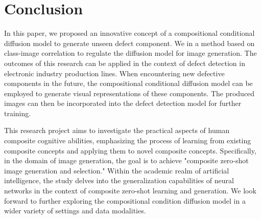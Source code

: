 \chapter{Conclusion}
In this paper, we proposed an innovative concept of a compositional conditional diffusion model to generate unseen defect component. We in a method based on class-image correlation to regulate the diffusion model for image generation. The outcomes of this research can be applied in the context of defect detection in electronic industry production lines. When encountering new defective components in the future, the compositional conditional diffusion model can be employed to generate visual representations of these components. The produced images can then be incorporated into the defect detection model for further training.

This research project aims to investigate the practical aspects of human composite cognitive abilities, emphasizing the process of learning from existing composite concepts and applying them to novel composite concepts. Specifically, in the domain of image generation, the goal is to achieve "composite zero-shot image generation and selection." Within the academic realm of artificial intelligence, the study delves into the generalization capabilities of neural networks in the context of composite zero-shot learning and generation. We look forward to further exploring the compositional condition diffusion model in a wider variety of settings and data modalities.
\label{chapter:fig}
